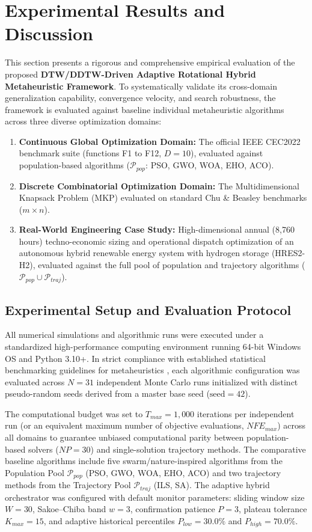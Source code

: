 \section{Experimental Results and Discussion}
\label{sec:results_and_discussion}

This section presents a rigorous and comprehensive empirical evaluation of the proposed \textbf{DTW/DDTW-Driven Adaptive Rotational Hybrid Metaheuristic Framework}. To systematically validate its cross-domain generalization capability, convergence velocity, and search robustness, the framework is evaluated against baseline individual metaheuristic algorithms across three diverse optimization domains:
\begin{enumerate}
    \item \textbf{Continuous Global Optimization Domain:} The official IEEE CEC2022 benchmark suite (functions F1 to F12, $D=10$), evaluated against population-based algorithms ($\mathcal{P}_{pop}$: PSO, GWO, WOA, EHO, ACO).
    \item \textbf{Discrete Combinatorial Optimization Domain:} The Multidimensional Knapsack Problem (MKP) evaluated on standard Chu \& Beasley benchmarks ($m \times n$).
    \item \textbf{Real-World Engineering Case Study:} High-dimensional annual (8,760 hours) techno-economic sizing and operational dispatch optimization of an autonomous hybrid renewable energy system with hydrogen storage (HRES2-H2), evaluated against the full pool of population and trajectory algorithms ($\mathcal{P}_{pop} \cup \mathcal{P}_{traj}$).
\end{enumerate}

\subsection{Experimental Setup and Evaluation Protocol}
\label{sec:experimental_setup}

All numerical simulations and algorithmic runs were executed under a standardized high-performance computing environment running 64-bit Windows OS and Python 3.10+. In strict compliance with established statistical benchmarking guidelines for metaheuristics \cite{derrac2011tutorial}, each algorithmic configuration was evaluated across $N = 31$ independent Monte Carlo runs initialized with distinct pseudo-random seeds derived from a master base seed ($\text{seed} = 42$).

The computational budget was set to $T_{max} = 1,000$ iterations per independent run (or an equivalent maximum number of objective evaluations, $NFE_{max}$) across all domains to guarantee unbiased computational parity between population-based solvers ($NP = 30$) and single-solution trajectory methods. The comparative baseline algorithms include five swarm/nature-inspired algorithms from the Population Pool $\mathcal{P}_{pop}$ (PSO, GWO, WOA, EHO, ACO) and two trajectory methods from the Trajectory Pool $\mathcal{P}_{traj}$ (ILS, SA). The adaptive hybrid orchestrator was configured with default monitor parameters: sliding window size $W = 30$, Sakoe--Chiba band $w = 3$, confirmation patience $P = 3$, plateau tolerance $K_{max} = 15$, and adaptive historical percentiles $P_{low} = 30.0\%$ and $P_{high} = 70.0\%$.

